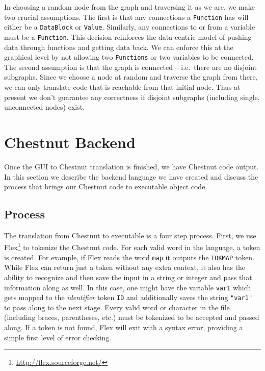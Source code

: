 \documentclass[twocolumn]{article}
\renewcommand{\|}{\origbar} %
\newcommand{\code}[1]{\texttt{#1}}
\begin{document}
In choosing a random node from the graph and traversing it as we are, we make two crucial assumptions. The first is that any connections a \code{Function} has will either be a \code{DataBlock} or \code{Value}. Similarly, any connections to or from a variable must be a \code{Function}. This decision reinforces the data-centric model of pushing data through functions and getting data back. We can enforce this at the graphical level by not allowing two \code{Functions} or two variables to be connected. The second assumption is that the graph is connected -- i.e.\ there are no disjoint subgraphs. Since we choose a node at random and traverse the graph from there, we can only translate code that is reachable from that initial node. Thus at present we don't guarantee any correctness if disjoint subgraphs (including single, unconnected nodes) exist.

\section{Chestnut Backend}
\label{sec:chestnutBackend}

Once the GUI to Chestnut translation is finished, we have Chestnut code output. In this section we describe the backend language we have created and discuss the process that brings our Chestnut code to executable object code.

\subsection{Process}

The translation from Chestnut to executable is a four step process. First, we use Flex\footnote{\url{http://flex.sourceforge.net/}} to tokenize the Chestnut code. For each valid word in the language, a token is created. For example, if Flex reads the word \code{map} it outputs the \code{TOKMAP} token. While Flex can return just a token without any extra context, it also has the ability to recognize and then save the input in a string or integer and pass that information along as well. In this case, one might have the variable \code{var1} which gets mapped to the {\em identifier} token \code{ID} and additionally saves the string \code{"var1"} to pass along to the next stage. Every valid word or character in the file (including braces, parentheses, etc.) must be tokenized to be accepted and passed along. If a token is not found, Flex will exit with a syntax error, providing a simple first level of error checking. 
\end{document}
